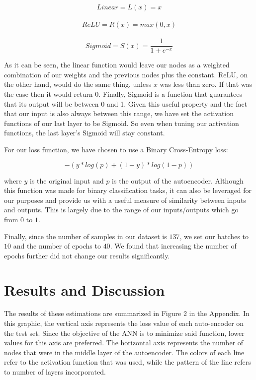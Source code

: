 \documentclass{article}
\begin{document}
\begin{equation}
    Linear = L(x) =  x
\end{equation}
\\
\begin{equation}
    ReLU = R(x) =  max(0, x)
\end{equation}
\\
\begin{equation}
    Sigmoid = S(x) =  \frac{\mathrm{1} }{\mathrm{1} + e^{-x} } 
\end{equation}

As it can be seen, the linear function would leave our nodes as a weighted combination of our weights and the previous nodes plus the constant. ReLU, on the other hand, would do the same thing, unless $x$ was less than zero. If that was the case then it would return $0$. Finally, Sigmoid is a function that guarantees that its output will be between 0 and 1. Given this useful property and the fact that our input is also always between this range, we have set the activation functions of our last layer to be Sigmoid. So even when tuning our activation functions, the last layer's Sigmoid will stay constant. 

For our loss function, we have chosen to use a Binary Cross-Entropy loss:

\begin{equation}
    - (y* log(p)+(1-y)*log(1-p))
\end{equation}

where \begin{math}y\end{math} is the original input and $p$ is the output of the autoencoder. Although this function was made for binary classification tasks, it can also be leveraged for our purposes and provide us with a useful measure of similarity between inputs and outputs. This is largely due to the range of our inputs/outputs which go from $0$ to $1$.  

Finally, since the number of samples in our dataset is $137$, we set our batches to $10$ and the number of epochs to $40$. We found that increasing the number of epochs further did not change our results significantly. 

\section{Results and Discussion}

The results of these estimations are summarized in Figure 2 in the Appendix. In this graphic, the vertical axis represents the loss value of each auto-encoder on the test set. Since the objective of the ANN is to minimize said function, lower values for this axis are preferred. The horizontal axis represents the number of nodes that were in the middle layer of the autoencoder. The colors of each line refer to the activation function that was used, while the pattern of the line refers to number of layers incorporated. 
\end{document}
